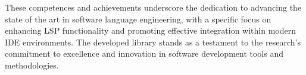 \documentclass{adapt-lab}
\begin{document}
These competences and achievements underscore the dedication to advancing the state of the art in software language engineering, with a specific focus on enhancing LSP functionality and promoting effective integration within modern IDE environments. The developed library stands as a testament to the research's commitment to excellence and innovation in software development tools and methodologies.

\begingroup
\let\clearpage\relax


\endgroup

\nocite{Cazzola20}
\nocite{Cazzola21b, Cazzola15f}
\nocite{Leduc20}
\nocite{Cazzola15c, Cazzola14c}
\nocite{Cazzola15f, Cazzola21b}
\nocite{Fowler10}
\nocite{Bettini13b}
\nocite{Barros22}
\nocite{Bunder19a}
\nocite{Rodriguez-Echeverria18a}
\nocite{Cazzola20}
\nocite{Rodriguez-Echeverria18}
\nocite{Cazzola23d, Cazzola20}
\nocite{Cazzola15f}
\nocite{Cazzola15f}
\nocite{Cazzola16, Cazzola16i, Cazzola15f}
\nocite{Haugen08, Cazzola14e, White09}
\nocite{Apel13, Czarnecki04, Prehofer01}
\nocite{Wende09}
\nocite{Cazzola15c, Cazzola14c}
\nocite{Cazzola19}

%
% 
% 
\end{document}
